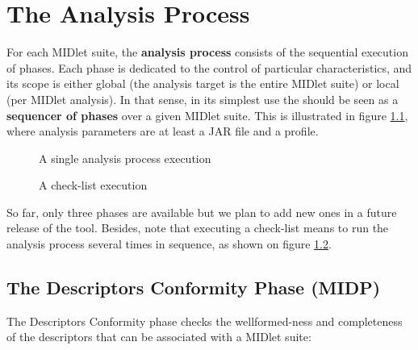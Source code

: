 \chapter{The Analysis Process}

For each MIDlet suite, the \textbf{analysis process} consists of the
sequential execution of phases. Each phase is dedicated to the control
of particular characteristics, and its scope is either global
(the analysis target is the entire MIDlet suite) or local (per MIDlet
analysis). In that sense, in its simplest use the \ma should be seen as a
\textbf{sequencer of phases} over a given MIDlet suite. This is
illustrated in figure \ref{figSAA}, where analysis parameters are at least a JAR
file and a profile.


\begin{figure}[h] 
\begin{center}
\end{center}
\caption{A single analysis process execution}
\label{figSAA}
\end{figure}

\begin{figure}[t]
\begin{center}
\end{center}
\caption{A check-list execution}
\label{figSeq2D}
\end{figure}


So far, only three phases are available but we plan to add new ones in
a future release of the tool. Besides, note that executing a
check-list means to run the analysis process several times
in sequence, as shown on figure \ref{figSeq2D}.


\section{The Descriptors Conformity Phase (MIDP)}
The Descriptors Conformity phase checks the wellformed-ness and completeness of the
descriptors that can be associated with a MIDlet suite: 

